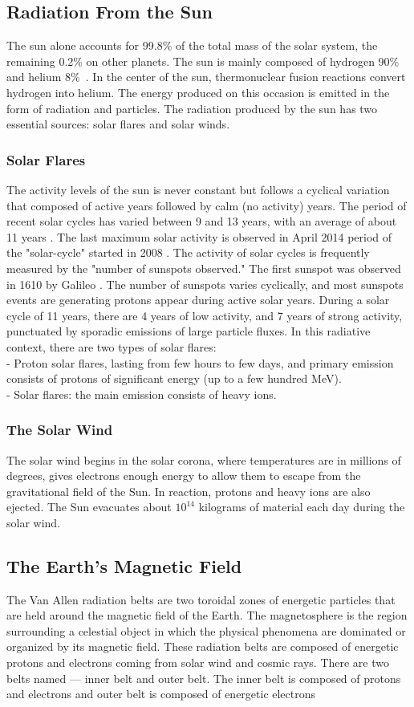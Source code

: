 \subsection{Radiation From the Sun} 
The sun alone accounts for 99.8\% of the total mass of the solar system, the remaining 0.2\% on other planets. The sun is mainly composed of hydrogen 90\% and helium 8\%~\citep{wikisun}. In the center of the sun, thermonuclear fusion reactions convert hydrogen into helium. The energy produced on this occasion is emitted in the form of radiation and particles. The radiation produced by the sun has two essential sources: solar flares and solar winds. 
\subsubsection{Solar Flares} 
The activity levels of the sun is never constant but follows a cyclical variation that composed of active years followed by calm (no activity) years. The period of recent solar cycles has
varied between 9 and 13 years, with an average of about 11 years \citep{nasa}. The last maximum solar activity is observed in April 2014 period of the "solar-cycle" started in 2008 \citep{nasa}. The activity of solar cycles is frequently measured by the "number of sunspots observed." The first sunspot was observed in 1610 by Galileo \citep{nasa}. The number of sunspots varies cyclically, and most sunspots events are
generating protons appear during active solar years. During a solar cycle of 11 years, there are 4 years of low activity, and 7 years of strong activity, punctuated by sporadic emissions of large particle fluxes. In this radiative context, there are two types of solar flares: \\
- Proton solar flares, lasting from few hours to few days, and primary emission consists of protons of significant energy (up to
a few hundred MeV). \\
- Solar flares: the main emission consists of heavy ions.
\subsubsection{The Solar Wind}
The solar wind begins in the solar corona, where temperatures are in millions of degrees, gives electrons enough energy to allow them to
escape from the gravitational field of the Sun. In reaction, protons and heavy ions are also ejected. The Sun evacuates about $10^{14}$ kilograms of material each day during the solar wind. 
\subsection{The Earth's Magnetic Field}
The Van Allen radiation belts are two toroidal zones of energetic particles that are held around the magnetic field of the Earth. The magnetosphere is the region surrounding a celestial object in which the
physical phenomena are dominated or organized by its magnetic field. These radiation belts are composed of energetic protons and electrons coming from solar wind and cosmic rays. There are two belts named --- inner belt and outer belt. The inner belt is composed of protons and electrons and outer belt is composed of energetic electrons~\citep{barth2003space}
